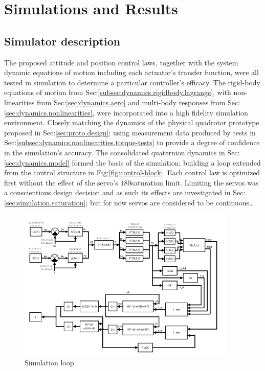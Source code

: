 \chapter{Simulations and Results}
\label{ch:simulation}
\section{Simulator description}
\label{sec:simulation.block}
The proposed attitude and position control laws, together with the system dynamic equations of motion including each actuator's transfer function, were all tested in simulation to determine a particular controller's efficacy. The rigid-body equations of motion from Sec:\ref{subsec:dynamics.rigidbody.lagrange}, with non-linearities from Sec:\ref{sec:dynamics.aero} and multi-body responses from Sec:\ref{sec:dynamics.nonlinearities}, were incorporated into a high fidelity simulation environment. Closely matching the dynamics of the physical quadrotor prototype proposed in Sec:\ref{sec:proto.design}; using measurement data produced by tests in Sec:\ref{subsec:dynamics.nonlinearities.torque-tests} to provide a degree of confidence in the simulation's accuracy. The consolidated quaternion dynamics in Sec:\ref{sec:dynamics.model} formed the basis of the simulation; building a loop extended from the control structure in Fig:\ref{fig:control-block}. Each control law is optimized first without the effect of the servo's $180$\textdegree saturation limit. Limiting the servos was a conscientious design decision and as such its effects are investigated in Sec:\ref{sec:simulation.saturation}; but for now servos are considered to be continuous\ldots
\par
\begin{figure}[htbp]
\vspace{-10pt}
\centering
\includegraphics[width=0.93\textwidth]{figs/simulation-block}
\vspace{-10pt}
\caption{Simulation loop}
\label{fig:simulation-block}
\end{figure}
